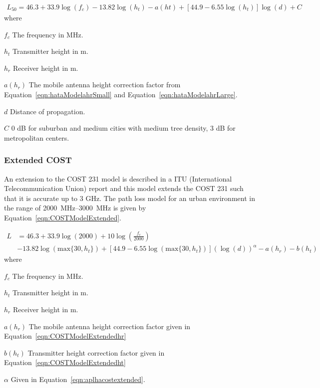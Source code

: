 \begin{align} 
\label{eqn:COSTModel}
L_{50} = 46.3+33.9 \log(f_c)-13.82 \log(h_t)-a(ht)+[44.9-6.55 \log(h_t)] \log(d) + C 
\end{align} 
where 
\begin{where}
\item [$f_c$] The frequency in \si{MHz}.
\item [$h_t$] Transmitter height in \si{m}. 
\item [$h_r$] Receiver height in \si{m}.
\item [$a(h_r)$] The mobile antenna height correction factor from Equation~\ref{eqn:hataModelahrSmall} and Equation~\ref{eqn:hataModelahrLarge}.
\item [$d$] Distance of propagation.
\item [$C$] 0 dB for suburban and medium cities with medium tree density, 3 dB for metropolitan centers. 
\end{where}

\subsubsection{Extended COST}
An extension to the COST 231 model is described in a ITU (International Telecommunication Union) report \cite{itu2002report} and this model extends the COST 231 such that it is accurate up to 3 GHz. The path loss model for an urban environment in the range of \SIrange{2000}{3000}{MHz} is given by Equation~\ref{eqn:COSTModelExtended}\cite{itu2002report}.   

\begin{equation} 
\label{eqn:COSTModelExtended}
\begin{aligned}
    L &= 46.3 + 33.9 \log(2000) + 10 \log\left(\frac{f_c}{2000}\right) \\
        &- 13.82 \log(\text{max}\{30,h_t\}) + [44.9 -6.55 \log(\text{max}\{30,h_t\})] (\log(d))^{\alpha} - a(h_r) - b(h_t)
\end{aligned}
\end{equation} 
where 
\begin{where}
\item [$f_c$] The frequency in \si{MHz}.
\item [$h_t$] Transmitter height in \si{m}. 
\item [$h_r$] Receiver height in \si{m}.
\item [$a(h_r)$] The mobile antenna height correction factor given in Equation~\ref{eqn:COSTModelExtendedhr}
\item [$b(h_t)$] Transmitter height correction factor given in Equation~\ref{eqn:COSTModelExtendedht}
\item [$\alpha$] Given in Equation~\ref{eqn:aplhacostextended}.
\end{where}

